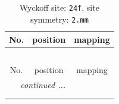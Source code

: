 \documentclass[fleqn,8pt]{jsarticle}
\begin{document}
\renewcommand{\arraystretch}{1.2}
\begin{longtable}{ccc}
\caption{Wyckoff site: {\tt 24f}, site symmetry: {\tt 2.mm}}
 \\
 \hline \hline
No. & position & mapping \\ \hline \endfirsthead

\multicolumn{2}{l}{\tablename\ \thetable{}} \\
 \hline \hline
No. & position & mapping \\ \hline \endhead

 \hline \hline
\multicolumn{2}{r}{\footnotesize\it continued ...} \\ \endfoot

 \hline \hline
\multicolumn{2}{r}{} \\ \endlastfoot


\end{longtable}
\end{document}
